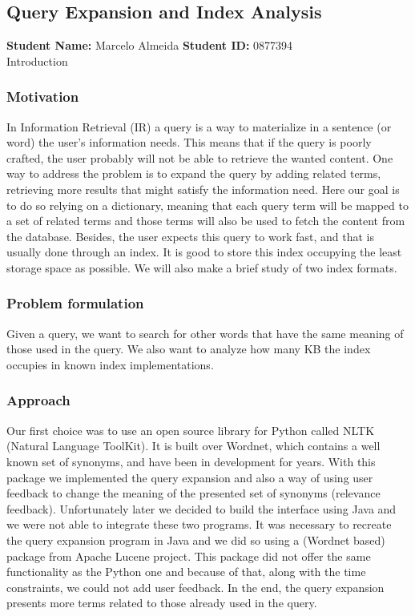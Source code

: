 \subsection{Query Expansion and Index Analysis}
\textbf{Student Name: }Marcelo Almeida \textbf{Student ID:} 0877394 \\
Introduction

\subsubsection*{Motivation}
In Information Retrieval (IR) a query is a way to materialize in a sentence (or word) the user's information needs. This means that if the query is poorly crafted, the user probably will not be able to retrieve the wanted content. One way to address the problem is to expand  the query by adding related terms, retrieving more results that might satisfy the information need. Here our goal is to do so relying on a dictionary, meaning that each query term will be mapped to a set of related terms and those terms will also be used to fetch the content from the database. Besides, the user expects this query to work fast, and that is usually done through an index. It is good to store this index occupying the least storage space as possible. We will also make a brief study of two index formats.

\subsubsection*{Problem formulation}
Given a query, we want to search for other words that have the same meaning of those used in the query. We also want to analyze how many KB the index occupies in known index implementations.


\subsubsection*{Approach}
Our first choice was to use an open source library for Python called NLTK (Natural Language ToolKit). It is built over Wordnet, which contains a well known set of synonyms, and have been in development for years. With this package we implemented the query expansion and also a way of using user feedback to change the meaning of the presented set of synonyms (relevance feedback). Unfortunately later we decided to build the interface using Java and we were not able to integrate these two programs. It was necessary to recreate the query expansion program in Java and we did so using a (Wordnet based) package from Apache Lucene project. This package did not offer the same functionality as the Python one and because of that, along with the time constraints, we could not add user feedback. In the end, the query expansion presents more terms related to those already used in the query.
 
